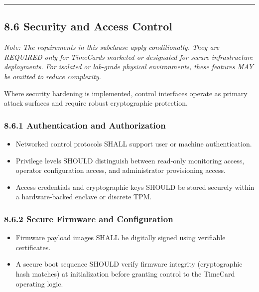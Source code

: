 \begin{center}\rule{0.5\linewidth}{0.5pt}\end{center}

\subsection{8.6 Security and Access
Control}\label{security-and-access-control}

\emph{Note: The requirements in this subclause apply conditionally. They
are REQUIRED only for TimeCards marketed or designated for secure
infrastructure deployments. For isolated or lab-grade physical
environments, these features MAY be omitted to reduce complexity.}

Where security hardening is implemented, control interfaces operate as
primary attack surfaces and require robust cryptographic protection.

\subsubsection{8.6.1 Authentication and
Authorization}\label{authentication-and-authorization}

\begin{itemize}
\tightlist
\item
  Networked control protocols SHALL support user or machine
  authentication.
\item
  Privilege levels SHOULD distinguish between read-only monitoring
  access, operator configuration access, and administrator provisioning
  access.
\item
  Access credentials and cryptographic keys SHOULD be stored securely
  within a hardware-backed enclave or discrete TPM.
\end{itemize}

\subsubsection{8.6.2 Secure Firmware and
Configuration}\label{secure-firmware-and-configuration}

\begin{itemize}
\tightlist
\item
  Firmware payload images SHALL be digitally signed using verifiable
  certificates.
\item
  A secure boot sequence SHOULD verify firmware integrity (cryptographic
  hash matches) at initialization before granting control to the
  TimeCard operating logic.
\end{itemize}

